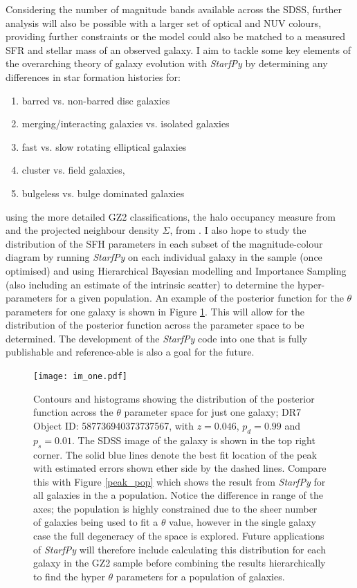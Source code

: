 \documentclass{mn2e}
\begin{document}
Considering the number of magnitude bands available across the SDSS, further analysis will also be possible with a larger set of optical and NUV colours, providing further constraints or the model could also be matched to a measured SFR and stellar mass of an observed galaxy. I aim to tackle some key elements of the overarching theory of galaxy evolution with \emph{StarfPy} by determining any differences in star formation histories for:
\begin{enumerate}
\item barred vs. non-barred disc galaxies
\item merging/interacting galaxies vs. isolated galaxies
\item fast vs. slow rotating elliptical galaxies
\item cluster vs. field galaxies,
\item bulgeless vs. bulge dominated galaxies
\end{enumerate}
using the more detailed GZ2 classifications, the halo occupancy measure from \citep{Yang07} and the projected neighbour density $\Sigma$, from \citet{Baldry06}. I also hope to study the distribution of the SFH parameters in each subset of the magnitude-colour diagram by running \emph{StarfPy} on each individual galaxy in the sample (once optimised) and using Hierarchical Bayesian modelling and Importance Sampling (also including an estimate of the intrinsic scatter) to determine the hyper-parameters for a given population. An example of the posterior function for the $\theta$ parameters for one galaxy is shown in Figure \ref{im_one}. This will allow for the distribution of the posterior function across the parameter space to be determined. The development of the \emph{StarfPy} code into one that is fully publishable and reference-able is also a goal for the future. 

\begin{figure}
\texttt{[image: im\_one.pdf]}
\caption{Contours and histograms showing the distribution of the posterior function across the $\theta$ parameter space for just one galaxy; DR7 Object ID: 587736940373737567, with $z=0.046$, $p_{d} = 0.99$ and $p_{s} = 0.01$. The SDSS image of the galaxy is shown in the top right corner. The solid blue lines denote the best fit location of the peak with estimated errors shown ether side by the dashed lines. Compare this with Figure \ref{peak_pop} which shows the result from \emph{StarfPy} for all galaxies in the a population. Notice the difference in range of the axes; the population is highly constrained due to the sheer number of galaxies being used to fit a $\theta$ value, however in the single galaxy case the full degeneracy of the space is explored. Future applications of \emph{StarfPy} will therefore include calculating this distribution for each galaxy in the GZ2 sample before combining the results hierarchically to find the hyper $\theta$ parameters for a population of galaxies.}
\label{im_one}
\end{figure}
\end{document}
